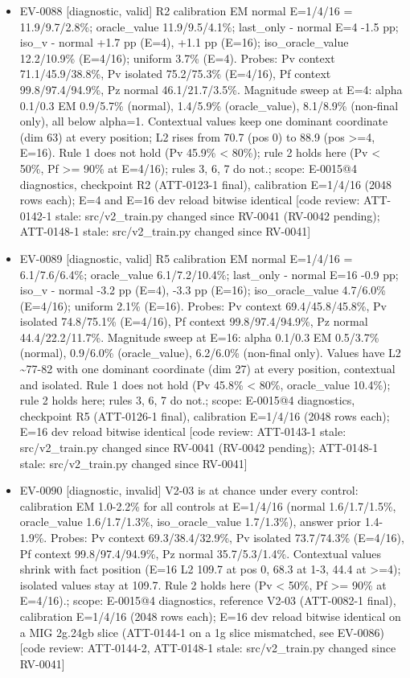 \documentclass[11pt]{article}
\begin{document}
\begin{itemize}
\item EV-0088 [diagnostic, valid] R2 calibration EM normal E=1/4/16 = 11.9/9.7/2.8\%; oracle\_value 11.9/9.5/4.1\%; last\_only - normal E=4 -1.5 pp; iso\_v - normal +1.7 pp (E=4), +1.1 pp (E=16); iso\_oracle\_value 12.2/10.9\% (E=4/16); uniform 3.7\% (E=4). Probes: Pv context 71.1/45.9/38.8\%, Pv isolated 75.2/75.3\% (E=4/16), Pf context 99.8/97.4/94.9\%, Pz normal 46.1/21.7/3.5\%. Magnitude sweep at E=4: alpha 0.1/0.3 EM 0.9/5.7\% (normal), 1.4/5.9\% (oracle\_value), 8.1/8.9\% (non-final only), all below alpha=1. Contextual values keep one dominant coordinate (dim 63) at every position; L2 rises from 70.7 (pos 0) to 88.9 (pos \textgreater{}=4, E=16). Rule 1 does not hold (Pv 45.9\% \textless{} 80\%); rule 2 holds here (Pv \textless{} 50\%, Pf \textgreater{}= 90\% at E=4/16); rules 3, 6, 7 do not.; scope: E-0015@4 diagnostics, checkpoint R2 (ATT-0123-1 final), calibration E=1/4/16 (2048 rows each); E=4 and E=16 dev reload bitwise identical [code review: ATT-0142-1 stale: src/v2\_train.py changed since RV-0041 (RV-0042 pending); ATT-0148-1 stale: src/v2\_train.py changed since RV-0041]
\item EV-0089 [diagnostic, valid] R5 calibration EM normal E=1/4/16 = 6.1/7.6/6.4\%; oracle\_value 6.1/7.2/10.4\%; last\_only - normal E=16 -0.9 pp; iso\_v - normal -3.2 pp (E=4), -3.3 pp (E=16); iso\_oracle\_value 4.7/6.0\% (E=4/16); uniform 2.1\% (E=16). Probes: Pv context 69.4/45.8/45.8\%, Pv isolated 74.8/75.1\% (E=4/16), Pf context 99.8/97.4/94.9\%, Pz normal 44.4/22.2/11.7\%. Magnitude sweep at E=16: alpha 0.1/0.3 EM 0.5/3.7\% (normal), 0.9/6.0\% (oracle\_value), 6.2/6.0\% (non-final only). Values have L2 \textasciitilde{}77-82 with one dominant coordinate (dim 27) at every position, contextual and isolated. Rule 1 does not hold (Pv 45.8\% \textless{} 80\%, oracle\_value 10.4\%); rule 2 holds here; rules 3, 6, 7 do not.; scope: E-0015@4 diagnostics, checkpoint R5 (ATT-0126-1 final), calibration E=1/4/16 (2048 rows each); E=16 dev reload bitwise identical [code review: ATT-0143-1 stale: src/v2\_train.py changed since RV-0041 (RV-0042 pending); ATT-0148-1 stale: src/v2\_train.py changed since RV-0041]
\item EV-0090 [diagnostic, invalid] V2-03 is at chance under every control: calibration EM 1.0-2.2\% for all controls at E=1/4/16 (normal 1.6/1.7/1.5\%, oracle\_value 1.6/1.7/1.3\%, iso\_oracle\_value 1.7/1.3\%), answer prior 1.4-1.9\%. Probes: Pv context 69.3/38.4/32.9\%, Pv isolated 73.7/74.3\% (E=4/16), Pf context 99.8/97.4/94.9\%, Pz normal 35.7/5.3/1.4\%. Contextual values shrink with fact position (E=16 L2 109.7 at pos 0, 68.3 at 1-3, 44.4 at \textgreater{}=4); isolated values stay at 109.7. Rule 2 holds here (Pv \textless{} 50\%, Pf \textgreater{}= 90\% at E=4/16).; scope: E-0015@4 diagnostics, reference V2-03 (ATT-0082-1 final), calibration E=1/4/16 (2048 rows each); E=16 dev reload bitwise identical on a MIG 2g.24gb slice (ATT-0144-1 on a 1g slice mismatched, see EV-0086) [code review: ATT-0144-2, ATT-0148-1 stale: src/v2\_train.py changed since RV-0041]

\end{itemize}
\end{document}
